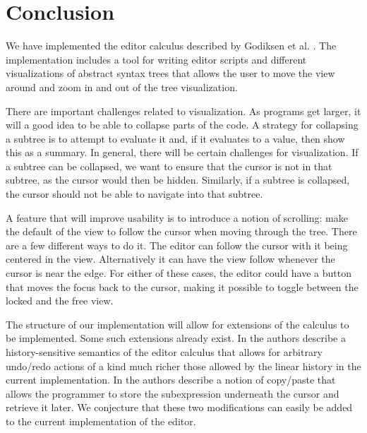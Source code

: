 \section{Conclusion}
\label{conclusion}

We have implemented the editor calculus described by Godiksen et
al. \pepm. The implementation includes a tool for writing editor
scripts and different visualizations of abstract syntax trees that
allows the user to move the view around and zoom in and out of the
tree visualization.

There are important challenges related to visualization. As programs
get larger, it will a good idea to be able to collapse parts of the
code. A strategy for collapsing a subtree is to attempt to evaluate it
and, if it evaluates to a value, then show this as a summary.  In
general, there will be certain challenges for visualization. If a
subtree can be collapsed, we want to ensure that the cursor is not in
that subtree, as the cursor would then be hidden. Similarly, if a
subtree is collapsed, the cursor should not be able to navigate into
that subtree.

A feature that will improve usability is to introduce a notion of
scrolling: make the default of the view to follow the cursor when
moving through the tree. There are a few different ways to do it. The
editor can follow the cursor with it being centered in the
view. Alternatively it can have the view follow whenever the cursor is
near the edge. For either of these cases, the editor could have a
button that moves the focus back to the cursor, making it possible to
toggle between the locked and the free view.

The structure of our implementation will allow for extensions of the
calculus to be implemented. Some such extensions already exist. 
In \cite{DBLP:conf/synasc/KjaerLMH21} the authors describe a
history-sensitive semantics of the editor calculus that allows for
arbitrary undo/redo actions of a kind much richer those allowed by the
linear history in the current implementation. In \cite{ifl2022} the
authors describe a notion of copy/paste that allows the programmer to
store the subexpression underneath the cursor and retrieve it
later. We conjecture that these two modifications can easily be added
to the current implementation of the editor.

